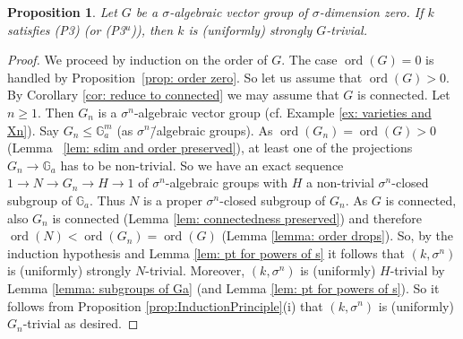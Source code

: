 \documentclass[oneside,reqno]{amsart}
\newtheorem{prop}[theo]{Proposition}
\theoremstyle{definition}
\newcommand{\sdim}{\sigma\text{-}\dim}
\newcommand{\ord}{\operatorname{ord}}
\newcommand{\s}{\sigma}
\newcommand{\Ga}{\mathbb{G}_a}
\newcommand{\pt}{{\rm{(P3$^u$)}}}
\newcommand{\ptweak}{{\rm{(P3)}}}
\begin{document}
	
	
	
	\begin{prop} \label{prop: vector groups of sdim 0 are strongly trivial}
 Let $G$ be a $\s$-algebraic vector group of $\s$-dimension zero. 
		If $k$ satisfies  \ptweak{} (or \pt{}), then $k$ is (uniformly) strongly $G$-trivial.
	\end{prop}
	\begin{proof}
		We proceed by induction on the order of $G$. The case $\ord(G)=0$ is handled by Proposition~\ref{prop: order zero}. So let us assume that $\ord(G)>0$. By Corollary \ref{cor: reduce to connected} we may assume that $G$ is connected. Let $n\geq 1$. Then $G_n$ is a $\s^n$-algebraic vector group (cf. Example \ref{ex: varieties and Xn}). Say $G_n\leq \Ga^m$ (as $\s^n$\=/algebraic groups). As $\ord(G_n)=\ord(G)>0$ (Lemma~ \ref{lem: sdim and order preserved}), at least one of the projections $G_n\to \Ga$ has to be non-trivial. 
%		
%		
		 So we have an exact sequence $1\to N\to G_n\to H\to 1$ of $\s^n$-algebraic groups with $H$ a non-trivial $\s^n$-closed subgroup of $\Ga$.
		 Thus $N$ is a proper $\s^n$-closed subgroup of $G_n$. As $G$ is connected, also $G_n$ is connected (Lemma \ref{lem: connectedness preserved}) and therefore $\ord(N)<\ord(G_n)=\ord(G)$ (Lemma \ref{lemma: order drops}).
		  So, by the induction hypothesis and Lemma \ref{lem: pt for powers of s} it follows that $(k,\s^n)$ is (uniformly) strongly $N$-trivial. Moreover, $(k,\s^n)$ is (uniformly) $H$-trivial by Lemma \ref{lemma: subgroups of Ga} (and Lemma \ref{lem: pt for powers of s}). So it follows from Proposition \ref{prop:InductionPrinciple}(i) that $(k,\s^n)$ is (uniformly) $G_n$-trivial as desired. \end{proof}
	
\end{document}
